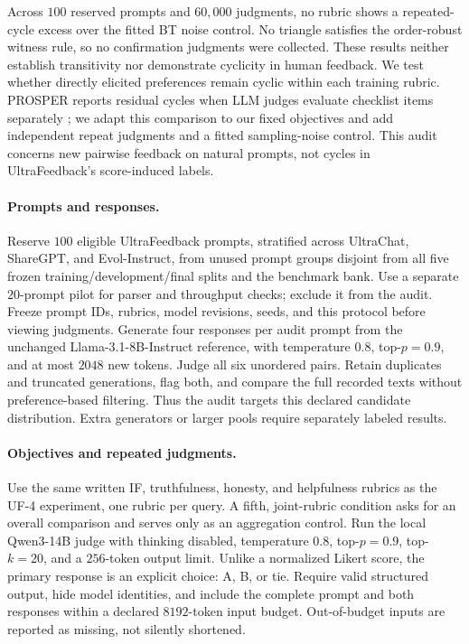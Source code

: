 \documentclass{article}
\theoremstyle{remark}
\theoremstyle{plain}
\begin{document}
Across $100$ reserved prompts and $60{,}000$ judgments, no rubric shows a repeated-cycle excess over the fitted BT noise control. No triangle satisfies the order-robust witness rule, so no confirmation judgments were collected. These results neither establish transitivity nor demonstrate cyclicity in human feedback.
We test whether directly elicited preferences remain cyclic within each training rubric. PROSPER reports residual cycles when LLM judges evaluate checklist items separately \citep{zhang2026prosper}; we adapt this comparison to our fixed objectives and add independent repeat judgments and a fitted sampling-noise control. This audit concerns new pairwise feedback on natural prompts, not cycles in UltraFeedback's score-induced labels.

\paragraph{Prompts and responses.}
Reserve $100$ eligible UltraFeedback prompts, stratified across UltraChat, ShareGPT, and Evol-Instruct, from unused prompt groups disjoint from all five frozen training/development/final splits and the benchmark bank. Use a separate $20$-prompt pilot for parser and throughput checks; exclude it from the audit. Freeze prompt IDs, rubrics, model revisions, seeds, and this protocol before viewing judgments. Generate four responses per audit prompt from the unchanged Llama-3.1-8B-Instruct reference, with temperature $0.8$, top-$p=0.9$, and at most $2048$ new tokens. Judge all six unordered pairs. Retain duplicates and truncated generations, flag both, and compare the full recorded texts without preference-based filtering. Thus the audit targets this declared candidate distribution. Extra generators or larger pools require separately labeled results.

\paragraph{Objectives and repeated judgments.}
Use the same written IF, truthfulness, honesty, and helpfulness rubrics as the UF-4 experiment, one rubric per query. A fifth, joint-rubric condition asks for an overall comparison and serves only as an aggregation control. Run the local Qwen3-14B judge with thinking disabled, temperature $0.8$, top-$p=0.9$, top-$k=20$, and a $256$-token output limit. Unlike a normalized Likert score, the primary response is an explicit choice: A, B, or tie. Require valid structured output, hide model identities, and include the complete prompt and both responses within a declared $8192$-token input budget. Out-of-budget inputs are reported as missing, not silently shortened.
\end{document}
